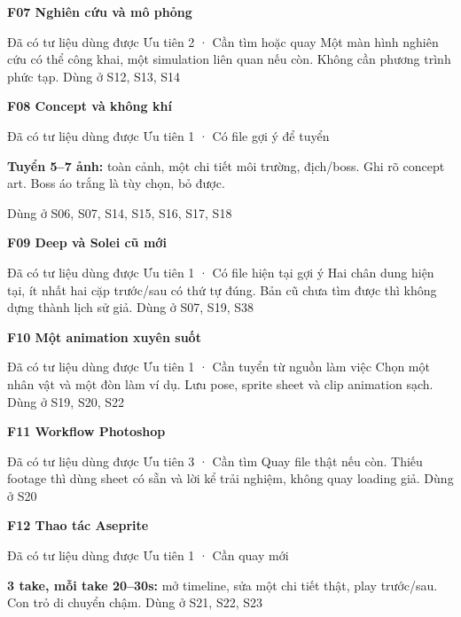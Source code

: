 \documentclass[10pt,a4paper]{article}
\begin{document}
\textbf{F07 Nghiên cứu và mô phỏng}\par

Đã có tư liệu dùng được Ưu tiên 2 · Cần tìm hoặc quay Một màn hình nghiên cứu có thể công khai, một simulation liên quan nếu còn. Không cần phương trình phức tạp. Dùng ở S12, S13, S14\par

\textbf{F08 Concept và không khí}\par

Đã có tư liệu dùng được Ưu tiên 1 · Có file gợi ý để tuyển\par

\textbf{Tuyển 5–7 ảnh:}  toàn cảnh, một chi tiết môi trường, địch/boss. Ghi rõ concept art. Boss áo trắng là tùy chọn, bỏ được.\par

\clearpage

Dùng ở S06, S07, S14, S15, S16, S17, S18\par

\textbf{F09 Deep và Solei cũ mới}\par

Đã có tư liệu dùng được Ưu tiên 1 · Có file hiện tại gợi ý Hai chân dung hiện tại, ít nhất hai cặp trước/sau có thứ tự đúng. Bản cũ chưa tìm được thì không dựng thành lịch sử giả. Dùng ở S07, S19, S38\par

\textbf{F10 Một animation xuyên suốt}\par

Đã có tư liệu dùng được Ưu tiên 1 · Cần tuyển từ nguồn làm việc Chọn một nhân vật và một đòn làm ví dụ. Lưu pose, sprite sheet và clip animation sạch. Dùng ở S19, S20, S22\par

\textbf{F11 Workflow Photoshop}\par

Đã có tư liệu dùng được Ưu tiên 3 · Cần tìm Quay file thật nếu còn. Thiếu footage thì dùng sheet có sẵn và lời kể trải nghiệm, không quay loading giả. Dùng ở S20\par

\textbf{F12 Thao tác Aseprite}\par

Đã có tư liệu dùng được Ưu tiên 1 · Cần quay mới\par

\textbf{3 take, mỗi take 20–30s:}  mở timeline, sửa một chi tiết thật, play trước/sau. Con trỏ di chuyển chậm. Dùng ở S21, S22, S23\par
\end{document}
